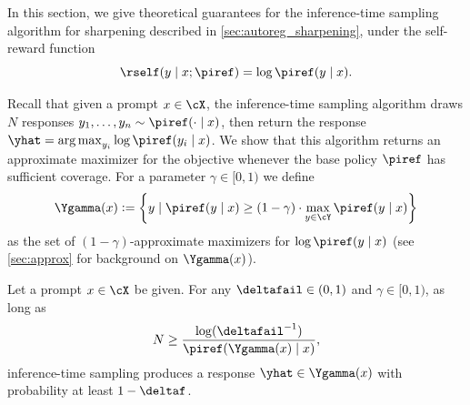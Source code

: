 
In this section, we give theoretical guarantees for the inference-time \bestofn sampling algorithm for sharpening described in \cref{sec:autoreg_sharpening}, under the \mlsharp self-reward function \[\rself(y\mid{}x;\piref) = \log\piref(y\mid{}x).\]

Recall that given a prompt $x\in\cX$, the inference-time \bestofn sampling algorithm draws $N$ responses
$y_1,\ldots,y_n\sim\piref(\cdot\mid{}x)$, then return the response
$\yhat=\argmax_{y_i}\log\piref(y_i\mid{}x)$. We show that this
algorithm returns an approximate maximizer for the \mlsharp objective
whenever the base policy $\piref$ has sufficient coverage. For a parameter $\gamma\in[0,1)$ we define
\begin{align}
  \Ygamma(x)\ldef{}\crl*{y\mid{}
  \piref(y\mid{}x)\geq{}(1-\gamma)\cdot\max_{y\in\cY}\piref(y\mid
  x)}
\end{align}%
as the set of $(1-\gamma)$-approximate maximizers for
$\log\piref(y\mid{}x)$ (see \cref{sec:approx} for background
on  $\Ygamma(x)$).\loose








\begin{proposition}
    \label{prop:bestofn_inference_general}
    Let a prompt $x\in\cX$ be given. For any $\deltafail\in(0,1)$ and
    $\gamma\in[0,1)$,
    as long as
        \begin{align}
      N \geq \frac{\log(\deltafail^{-1})}{\piref(\Ygamma(x)\mid{}x)},
        \end{align}
        inference-time \bestofn sampling produces a response
        $
    \yhat\in\Ygamma(x)$ with probability at least $1-\deltaf$.
  \end{proposition}

